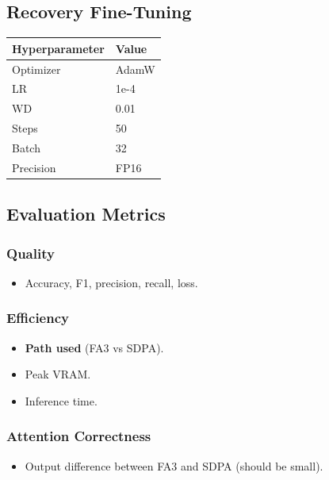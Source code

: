 \subsection{Recovery Fine-Tuning}

\begin{table}[H]
\centering
\small
\begin{tabular}{ll}
\toprule
\textbf{Hyperparameter} & \textbf{Value} \\
\midrule
Optimizer & AdamW \\
LR & 1e-4 \\
WD & 0.01 \\
Steps & 50 \\
Batch & 32 \\
Precision & FP16 \\
\bottomrule
\end{tabular}
\end{table}

\subsection{Evaluation Metrics}

\subsubsection{Quality}
\begin{itemize}
\item Accuracy, F1, precision, recall, loss.

\end{itemize}
\subsubsection{Efficiency}
\begin{itemize}
\item \textbf{Path used} (FA3 vs SDPA).
\item Peak VRAM.
\item Inference time.

\end{itemize}
\subsubsection{Attention Correctness}
\begin{itemize}
\item Output difference between FA3 and SDPA (should be small).

\end{itemize}
